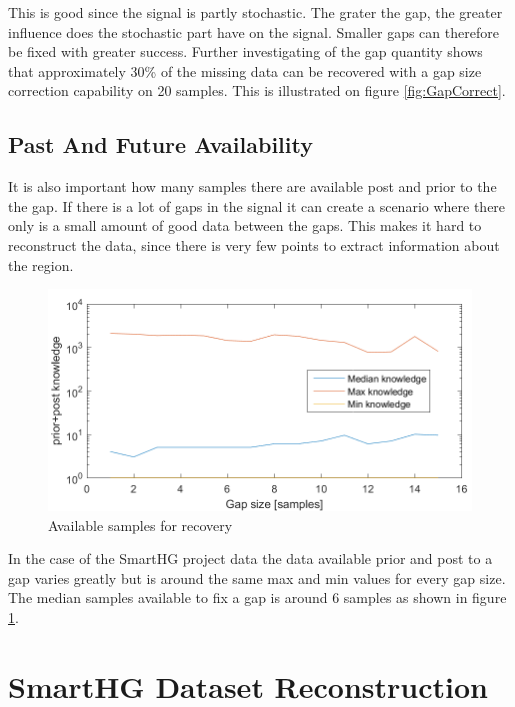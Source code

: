 
This is good since the signal is partly stochastic. The grater the gap, the greater influence does the stochastic part have on the signal. Smaller gaps can therefore be fixed with greater success. Further investigating of the gap quantity shows that approximately 30\% of the missing data can be recovered with a gap size correction capability on 20 samples. This is illustrated on figure \ref{fig:GapCorrect}.  

\subsection{Past And Future Availability}
It is also important how many samples there are available post and prior to the the gap. If there is a lot of gaps in the signal it can create a scenario where there only is a small amount of good data between the gaps. This makes it hard to reconstruct the data, since there is very few points to extract information about the region. 

\begin{figure}[H]
\centering
\includegraphics[width=0.7\linewidth]{billeder/GapInfo2.png}\caption{Available samples for recovery}
\label{fig:PAF}
\end{figure}



In the case of the SmartHG project data the data available prior and post to a gap varies greatly but is around the same max and min values for every gap size. The median samples available to fix a gap is around 6 samples as shown in figure \ref{fig:PAF}. 

\section{SmartHG Dataset Reconstruction}

